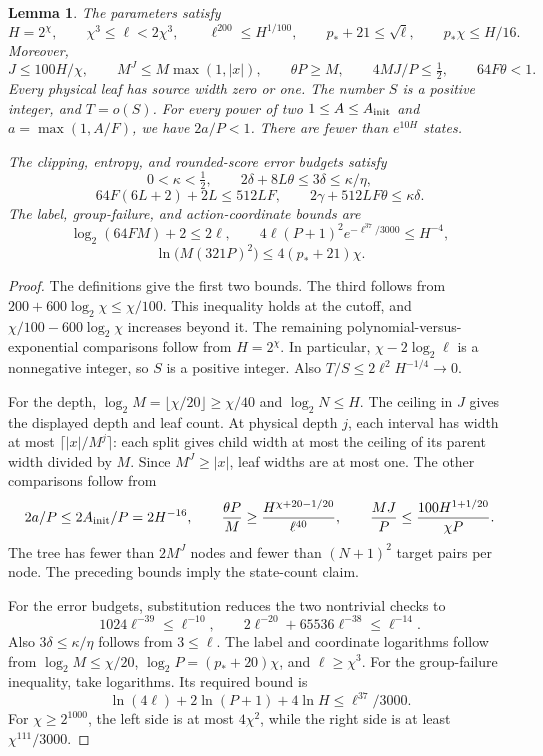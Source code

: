 \documentclass[11pt]{article}
\newtheorem{lemma}[theorem]{Lemma}
\theoremstyle{definition}
\newcommand{\1}{\mathbf 1}
\begin{document}
\begin{lemma}\label{refine:lem:parameters}
The parameters satisfy
\[
 H=2^\chi,\qquad \chi^3\le\ell<2\chi^3,\qquad
 \ell^{200}\le H^{1/100},\qquad
 p_*+21\le\sqrt\ell,\qquad p_*\chi\le H/16.
\]
Moreover,
\[
 J\le100H/\chi,\qquad M^J\le M\max(1,|x|),\qquad
 \theta P\ge M,\qquad 4MJ/P\le\tfrac12,
 \qquad64F\theta<1.
\]
Every physical leaf has source width zero or one.
The number $S$ is a positive integer, and $T=o(S)$.
For every power of two $1\le A\le A_{\rm init}$ and
$a=\max(1,A/F)$, we have $2a/P<1$.
There are fewer than $e^{10H}$ states.

The clipping, entropy, and rounded-score error budgets satisfy
\[
 0<\kappa<\tfrac12,\qquad
 2\delta+8L\theta\le3\delta\le\kappa/\eta,
\]
\[
 64F(6L+2)+2L\le512LF,\qquad
 2\gamma+512LF\theta\le\kappa\delta.
\]
The label, group-failure, and action-coordinate bounds are
\[
 \log_2(64FM)+2\le2\ell,\qquad
 4\ell(P+1)^2e^{-\ell^{37}/3000}\le H^{-4},
\]
\[
 \ln\!\bigl(M(321P)^2\bigr)\le4(p_*+21)\chi.
\]
\end{lemma}
\begin{proof}
The definitions give the first two bounds. The third follows from
$200+600\log_2\chi\le\chi/100$. This inequality holds at the cutoff,
and $\chi/100-600\log_2\chi$ increases beyond it. The remaining
polynomial-versus-exponential comparisons follow from $H=2^\chi$.
In particular, $\chi-2\log_2\ell$ is a nonnegative integer, so $S$ is
a positive integer. Also $T/S\le2\ell^2H^{-1/4}\to0$.

For the depth, $\log_2M=\lfloor\chi/20\rfloor\ge\chi/40$ and
$\log_2N\le H$. The ceiling in $J$ gives the displayed depth and leaf
count. At physical depth $j$, each interval has width at most
$\lceil|x|/M^j\rceil$: each split gives child width at most the ceiling
of its parent width divided by $M$. Since $M^J\ge|x|$, leaf widths
are at most one. The other comparisons follow from
\[
 2a/P\le2A_{\rm init}/P=2H^{-16},\qquad
 \frac{\theta P}{M}\ge
 \frac{H^{\chi+20-1/20}}{\ell^{40}},\qquad
 \frac{MJ}{P}\le\frac{100H^{1+1/20}}{\chi P}.
\]
The tree has fewer than $2M^J$ nodes and fewer than $(N+1)^2$ target
pairs per node. The preceding bounds imply the state-count claim.

For the error budgets, substitution reduces the two nontrivial checks to
\[
 1024\ell^{-39}\le\ell^{-10},\qquad
 2\ell^{-20}+65536\ell^{-38}\le\ell^{-14}.
\]
Also $3\delta\le\kappa/\eta$ follows from $3\le\ell$.
The label and coordinate logarithms follow from
$\log_2M\le\chi/20$, $\log_2P=(p_*+20)\chi$, and
$\ell\ge\chi^3$.
For the group-failure inequality, take logarithms. Its required bound is
\[
 \ln(4\ell)+2\ln(P+1)+4\ln H\le\ell^{37}/3000.
\]
For $\chi\ge2^{1000}$, the left side is at most $4\chi^2$, while the
right side is at least $\chi^{111}/3000$.
\end{proof}
\end{document}
